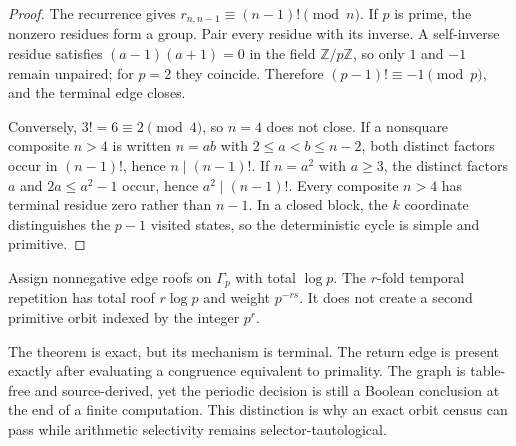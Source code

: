 \begin{proof}
The recurrence gives $r_{n,n-1}\equiv(n-1)!\pmod n$.  If $p$ is prime, the
nonzero residues form a group.  Pair every residue with its inverse.  A
self-inverse residue satisfies $(a-1)(a+1)=0$ in the field
$\mathbb Z/p\mathbb Z$, so only $1$ and $-1$ remain unpaired; for $p=2$ they
coincide.  Therefore $(p-1)!\equiv-1\pmod p$, and the terminal edge closes.

Conversely, $3!=6\equiv2\pmod4$, so $n=4$ does not close.  If a nonsquare
composite $n>4$ is written $n=ab$ with $2\leq a<b\leq n-2$, both distinct
factors occur in $(n-1)!$, hence $n\mid(n-1)!$.  If $n=a^2$ with $a\geq3$,
the distinct factors $a$ and $2a\leq a^2-1$ occur, hence
$a^2\mid(n-1)!$.  Every composite $n>4$ has terminal residue zero rather than
$n-1$.  In a closed block, the $k$ coordinate distinguishes the
$p-1$ visited states, so the deterministic cycle is simple and primitive.
\end{proof}

\begin{corollary}
\label{cor:prime-powers}
Assign nonnegative edge roofs on $\Gamma_p$ with total $\log p$.  The
$r$-fold temporal repetition has total roof $r\log p$ and weight $p^{-rs}$.
It does not create a second primitive orbit indexed by the integer $p^r$.
\end{corollary}

The theorem is exact, but its mechanism is terminal.  The return edge is
present exactly after evaluating a congruence equivalent to primality.  The
graph is table-free and source-derived, yet the periodic decision is still a
Boolean conclusion at the end of a finite computation.  This distinction is
why an exact orbit census can pass while arithmetic selectivity remains
selector-tautological.
